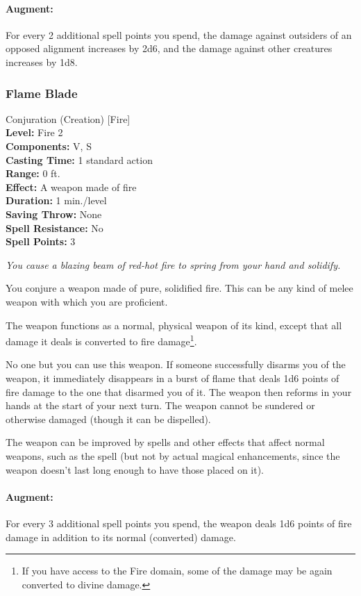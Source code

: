 \paragraph{Augment:} For every 2 additional spell points you spend, 
the damage against outsiders of an opposed alignment increases by 2d6, 
and the damage against other creatures increases by 1d8.
\subsubsection{Flame Blade}
\label{Spell:FlameBlade}
Conjuration (Creation) [Fire]
\\ \textbf{Level:} Fire 2
\\ \textbf{Components:} V, S
\\ \textbf{Casting Time:} 1 standard action
\\ \textbf{Range:} 0 ft.
\\ \textbf{Effect:} A weapon made of fire
\\ \textbf{Duration:} 1 min./level
\\ \textbf{Saving Throw:} None
\\ \textbf{Spell Resistance:} No
\\ \textbf{Spell Points:} 3

\emph{You cause a blazing beam of red-hot fire to spring from your hand and solidify.}

You conjure a weapon made of pure, solidified fire.
This can be any kind of melee weapon with which you are proficient.

The weapon functions as a normal, physical weapon of its kind, except that all damage it deals is converted to fire damage\footnote{If you have access to the Fire domain, some of the damage may be again converted to divine damage.}.

No one but you can use this weapon. If someone successfully disarms you of the weapon, it immediately disappears in a burst of flame that deals 1d6 points of fire damage to the one that disarmed you of it.
The weapon then reforms in your hands at the start of your next turn.
The weapon cannot be sundered or otherwise damaged (though it can be dispelled).

The weapon can be improved by spells and other effects that affect normal weapons, such as the  spell (but not by actual magical enhancements, since the weapon doesn't last long enough to have those placed on it). 

\paragraph{Augment:} For every 3 additional spell points you spend, the weapon deals 1d6 points of fire damage in addition to its normal (converted) damage.
